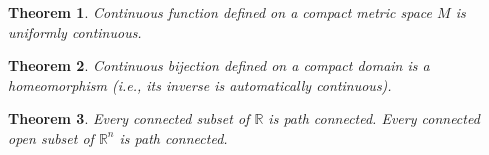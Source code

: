 \documentclass[11pt]{article}
\newcommand{\bbR}{\mathbb{R}}
\renewcommand{\_}[1]{\underline{ #1 }}
\newtheorem{theorem}{Theorem}[section]
\theoremstyle{definition}
\numberwithin{equation}{subsection}
\begin{document}
\begin{theorem}
    Continuous function defined on a compact metric space $M$ is uniformly continuous.
\end{theorem}

\begin{theorem}
    Continuous bijection defined on a compact domain is a homeomorphism (i.e., its inverse is automatically continuous).
\end{theorem}

\begin{theorem}
Every connected subset of $\bbR$ is path connected. Every connected open subset of $\bbR^n$ is path connected.
\end{theorem}
\end{document}
